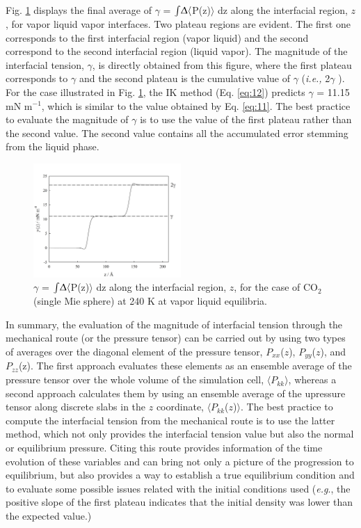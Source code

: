 \documentclass[9pt,bestpractices]{livecoms}
\begin{document}
Fig. \ref{fig:18} displays the final average of ${\gamma}$
= ${\int}{\Updelta}{\langle}$P(z)${\rangle}$ dz along the interfacial
region, $z$, for vapor \textendash{} liquid \textendash{} vapor
interfaces. Two plateau regions are evident.
The first one corresponds to the first interfacial region (vapor \textendash{}
liquid) and the second correspond to the second interfacial region (liquid
\textendash{} vapor). The magnitude of the interfacial tension, ${\gamma}$, is
directly obtained from this figure, where the first plateau corresponds to
${\gamma}$ and the second plateau is the cumulative value of ${\gamma}$
(\textit{i.e.,} 2${\gamma}$ ). For the case illustrated in Fig. \ref{fig:18}, the IK
method (Eq. \ref{eq:12}) predicts ${\gamma}$ = 11.15 mN m$^{-1}$, which is similar to
the value obtained by Eq. \ref{eq:11}.
The best practice to evaluate the magnitude of ${\gamma}$ is to use the value
of the first plateau rather than the second value. The second value contains
all the accumulated error stemming from the liquid phase.
\begin{figure}
\includegraphics[width=0.5\textwidth]{gfx/image63.jpeg}
\caption{${\gamma}$ = ${\int}{\Updelta}{\langle}$P(z)${\rangle}$ dz along the interfacial region, $z$, for the case of CO$_{2}$ (single Mie sphere) at 240 K at vapor \textendash{} liquid equilibria.}
\label{fig:18}
\end{figure}

In summary, the evaluation of the magnitude of interfacial tension through the
mechanical route (or the pressure tensor) can be carried out by using two types
of averages over the diagonal element of the pressure tensor,
$P_{xx}$($z$), $P_{yy}$($z$), and
$P_{zz}$(z). The first approach evaluates these elements as an
ensemble average of the pressure tensor over the whole volume of the simulation
cell, ${\langle}P_{kk}{\rangle}$, whereas a second approach
calculates them by using an ensemble average of the upressure tensor along
discrete slabs in the $z$ coordinate,
${\langle}P_{kk}$($z$)${\rangle}$. The best practice to
compute the interfacial tension from the mechanical route is to use the latter 
method, which not only provides the interfacial tension value but also the
normal or equilibrium pressure. Citing \citet{holcomb1993} this route provides information of the time
evolution of these variables and can bring not only a picture of the
progression to equilibrium,  but also provides a way to establish a true
equilibrium condition and to evaluate some possible issues related with the
initial conditions used (\textit{e.g}., the positive slope of the first plateau
indicates that the initial density was lower than the expected value.) 
\end{document}
